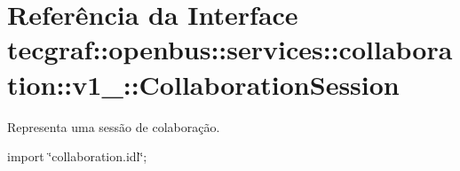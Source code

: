 \hypertarget{interfacetecgraf_1_1openbus_1_1services_1_1collaboration_1_1v1__0_1_1CollaborationSession}{\section{\-Referência da \-Interface tecgraf\-:\-:openbus\-:\-:services\-:\-:collaboration\-:\-:v1\-\_\-:\-:\-Collaboration\-Session}
\label{interfacetecgraf_1_1openbus_1_1services_1_1collaboration_1_1v1__0_1_1CollaborationSession}
}


\-Representa uma sessão de colaboração.  




{\ttfamily import \char`\"{}collaboration.\-idl\char`\"{};}

